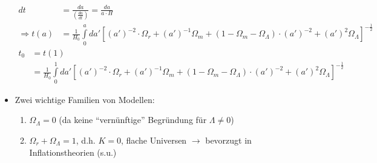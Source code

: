 \begin{itemize}
		\begin{align*}
			dt&=\frac{da}{\left(\frac{da}{dt}\right)}=\frac{da}{a\cdot H}\\
			\Rightarrow t(a)&=\frac{1}{H_0}\int\limits_0^ada'\left[(a')^{-2}\cdot\Omega_r+(a')^{-1}\Omega_m+\left(1-\Omega_m-\Omega_\Lambda\right)\cdot(a')^{-2}+(a')^2\Omega_\Lambda\right]^{-\frac{1}{2}}
		\end{align*}
		\begin{align*}
			t_0&=t(1)\\
			&=\frac{1}{H_0}\int\limits_0^1da'\left[(a')^{-2}\cdot\Omega_r+(a')^{-1}\Omega_m+\left(1-\Omega_m-\Omega_\Lambda\right)\cdot(a')^{-2}+(a')^2\Omega_\Lambda\right]^{-\frac{1}{2}}
		\end{align*}
	\item Zwei wichtige Familien von Modellen:
		\begin{enumerate}[label={$(\roman*)$}]
			\item $\Omega_\Lambda = 0$ (da keine "`vernünftige"' Begründung für $\Lambda\neq 0$)
			\item $\Omega_r+\Omega_\Lambda=1$, d.h. $K=0$, flache Universen $\to$ bevorzugt in Inflationstheorien (s.u.)
				\begin{figure}[H]
				\end{figure}
		\end{enumerate}
\end{itemize}

